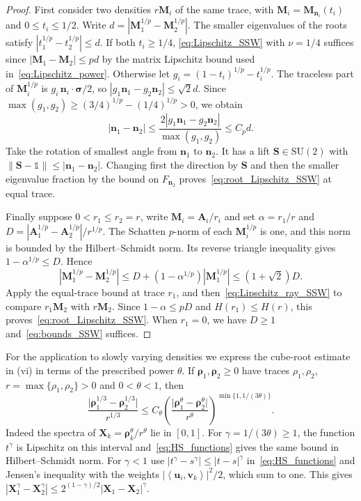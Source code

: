 \documentclass[final,reqno]{amsart}
\theoremstyle{remark}
\renewcommand{\le}{\leqslant}
\renewcommand{\ge}{\geqslant}
\newcommand{\SU}{\mathrm{SU}}
\newcommand{\pscal}[1]{\left\langle #1 \right\rangle}
\newcommand{\iden}{\mathbb{1}}
\begin{document}
\begin{proof}
First consider two densities $r\mathbf{M}_i$ of the same trace, with $\mathbf{M}_i=\mathbf{M}_{\mathbf{n}_i}(t_i)$ and $0\le t_i\le1/2$. Write $d=|\mathbf{M}_1^{1/p}-\mathbf{M}_2^{1/p}|$. The smaller eigenvalues of the roots satisfy $|t_1^{1/p}-t_2^{1/p}|\le d$. If both $t_i\ge1/4$, \cref{eq:Lipschitz_SSW} with $\nu=1/4$ suffices since $|\mathbf{M}_1-\mathbf{M}_2|\le p d$ by the matrix Lipschitz bound used in~\cref{eq:Lipschitz_power}. Otherwise let $g_i=(1-t_i)^{1/p}-t_i^{1/p}$. The traceless part of $\mathbf{M}_i^{1/p}$ is $g_i\,\mathbf{n}_i\cdot\bm{\sigma}/2$, so $|g_1\mathbf{n}_1-g_2\mathbf{n}_2|\le\sqrt2 d$. Since $\max(g_1,g_2)\ge (3/4)^{1/p}-(1/4)^{1/p}>0$, we obtain
$$
|\mathbf{n}_1-\mathbf{n}_2|\le \frac{2|g_1\mathbf{n}_1-g_2\mathbf{n}_2|}{\max(g_1,g_2)}\le C_p d.
$$
Take the rotation of smallest angle from $\mathbf{n}_1$ to $\mathbf{n}_2$. It has a lift $\mathbf{S}\in\SU(2)$ with $\|\mathbf{S}-\iden\|\le|\mathbf{n}_1-\mathbf{n}_2|$. Changing first the direction by $\mathbf{S}$ and then the smaller eigenvalue fraction by the bound on $F_{\mathbf{n}_2}$ proves~\cref{eq:root_Lipschitz_SSW} at equal trace.

Finally suppose $0<r_1\le r_2=r$, write $\mathbf{M}_i=\mathbf{A}_i/r_i$ and set $\alpha=r_1/r$ and $D=|\mathbf{A}_1^{1/p}-\mathbf{A}_2^{1/p}|/r^{1/p}$. The Schatten $p$-norm of each $\mathbf{M}_i^{1/p}$ is one, and this norm is bounded by the Hilbert--Schmidt norm. Its reverse triangle inequality gives $1-\alpha^{1/p}\le D$. Hence
$$
|\mathbf{M}_1^{1/p}-\mathbf{M}_2^{1/p}|
\le D+(1-\alpha^{1/p})|\mathbf{M}_1^{1/p}|\le (1+\sqrt2)D .
$$
Apply the equal-trace bound at trace $r_1$, and then~\cref{eq:Lipschitz_ray_SSW} to compare $r_1\mathbf{M}_2$ with $r\mathbf{M}_2$. Since $1-\alpha\le pD$ and $H(r_1)\le H(r)$, this proves~\cref{eq:root_Lipschitz_SSW}. When $r_1=0$, we have $D\ge1$ and~\cref{eq:bounds_SSW} suffices.
\end{proof}

For the application to slowly varying densities we express the cube-root estimate in (vi) in terms of the prescribed power $\theta$. If $\bm{\rho}_1,\bm{\rho}_2\ge0$ have traces $\rho_1,\rho_2$, $r=\max\{\rho_1,\rho_2\}>0$ and $0<\theta<1$, then
\begin{equation}\label{eq:theta_to_cube_root}
\frac{\big|\bm{\rho}_1^{1/3}-\bm{\rho}_2^{1/3}\big|}{r^{1/3}}\le C_\theta\left(\frac{\big|\bm{\rho}_1^{\theta}-\bm{\rho}_2^{\theta}\big|}{r^{\theta}}\right)^{\min\{1,1/(3\theta)\}} .
\end{equation}
Indeed the spectra of $\mathbf{X}_k=\bm{\rho}_k^\theta/r^\theta$ lie in $[0,1]$. For $\gamma=1/(3\theta)\ge1$, the function $t^\gamma$ is Lipschitz on this interval and~\cref{eq:HS_functions} gives the same bound in Hilbert--Schmidt norm. For $\gamma<1$ use $|t^\gamma-s^\gamma|\le|t-s|^\gamma$ in~\cref{eq:HS_functions} and Jensen's inequality with the weights $|\pscal{\mathbf{u}_i,\mathbf{v}_k}|^2/2$, which sum to one. This gives $|\mathbf{X}_1^\gamma-\mathbf{X}_2^\gamma|\le2^{(1-\gamma)/2}|\mathbf{X}_1-\mathbf{X}_2|^\gamma$.
\end{document}
